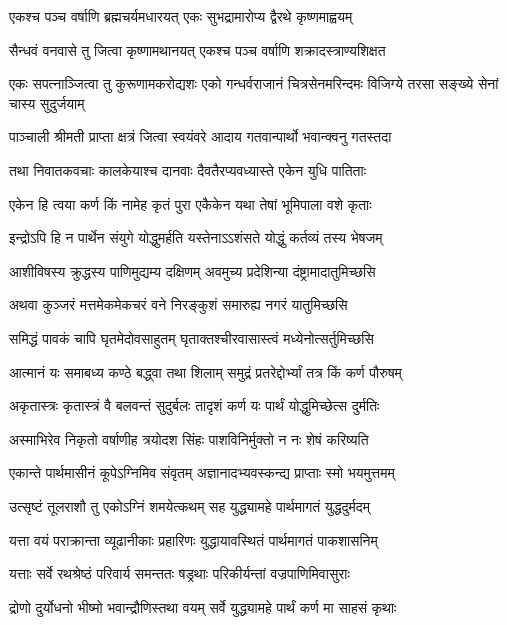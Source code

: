 \twolineshloka
{एकश्च पञ्च वर्षाणि ब्रह्मचर्यमधारयत्}
{एकः सुभद्रामारोप्य द्वैरथे कृष्णमाह्वयम्}


\twolineshloka
{सैन्धवं वनवासे तु जित्वा कृष्णामथानयत्}
{एकश्च पञ्च वर्षाणि शक्रादस्त्राण्यशिक्षत}


\threelineshloka
{एकः सपत्नाञ्जित्वा तु कुरूणामकरोद्यशः}
{एको गन्धर्वराजानं चित्रसेनमरिन्दमः}
{विजिग्ये तरसा सङ्ख्ये सेनां चास्य सुदुर्जयाम्}


\twolineshloka
{पाञ्चाली श्रीमती प्राप्ता क्षत्रं जित्वा स्वयंवरे}
{आदाय गतवान्पार्थो भवान्क्वनु गतस्तदा}


\twolineshloka
{तथा निवातकवचाः कालकेयाश्च दानवाः}
{दैवतैरप्यवध्यास्ते एकेन युधि पातिताः}


\twolineshloka
{एकेन हि त्वया कर्ण किं नामेह कृतं पुरा}
{एकैकेन यथा तेषां भूमिपाला वशे कृताः}


\twolineshloka
{इन्द्रोऽपि हि न पार्थेन संयुगे योद्धुमर्हति}
{यस्तेनाऽऽशंसते योद्धुं कर्तव्यं तस्य भेषजम्}


\twolineshloka
{आशीविषस्य क्रुद्धस्य पाणिमुद्यम्य दक्षिणम्}
{अवमुच्य प्रदेशिन्या दंष्ट्रामादातुमिच्छसि}


\twolineshloka
{अथवा कुञ्जरं मत्तमेकमेकचरं वने}
{निरङ्कुशं समारुह्य नगरं यातुमिच्छसि}


\twolineshloka
{समिद्धं पावकं चापि घृतमेदोवसाहुतम्}
{घृताक्तश्चीरवासास्त्वं मध्येनोत्सर्तुमिच्छसि}


\twolineshloka
{आत्मानं यः समाबध्य कण्ठे बद्ध्वा तथा शिलाम्}
{समुद्रं प्रतरेद्दोर्भ्यां तत्र किं कर्ण पौरुषम्}


\twolineshloka
{अकृतास्त्रः कृतास्त्रं वै बलवन्तं सुदुर्बलः}
{तादृशं कर्ण यः पार्थं योद्धुमिच्छेत्स दुर्मतिः}


\twolineshloka
{अस्माभिरेव निकृतो वर्षाणीह त्रयोदश}
{सिंहः पाशविनिर्मुक्तो न नः शेषं करिष्यति}


\twolineshloka
{एकान्ते पार्थमासीनं कूपेऽग्निमिव संवृतम्}
{अज्ञानादभ्यवस्कन्द्य प्राप्ताः स्मो भयमुत्तमम्}


\twolineshloka
{उत्सृष्टं तूलराशौ तु एकोऽग्निं शमयेत्कथम्}
{सह युद्ध्यामहे पार्थमागतं युद्धदुर्मदम्}


\twolineshloka
{यत्ता वयं पराक्रान्ता व्यूढानीकाः प्रहारिणः}
{युद्धायावस्थितं पार्थमागतं पाकशासनिम्}


\twolineshloka
{यत्ताः सर्वे रथश्रेष्ठं परिवार्य समन्ततः}
{षड्रथाः परिकीर्यन्तां वज्रपाणिमिवासुराः}


\twolineshloka
{द्रोणो दुर्योधनो भीष्मो भवान्द्रौणिस्तथा वयम्}
{सर्वे युद्ध्यामहे पार्थं कर्ण मा साहसं कृथाः}



